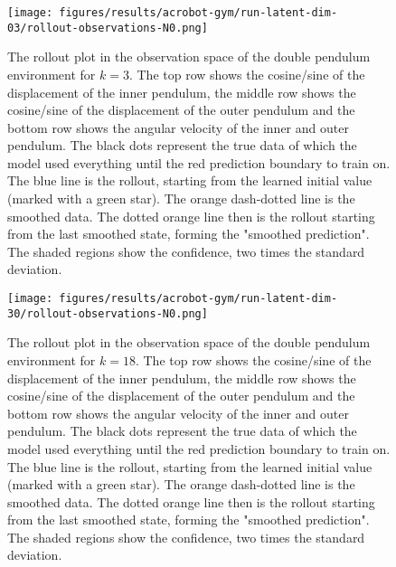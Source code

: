 		\begin{figure}
			\centering
			\texttt{[image: figures/results/acrobot-gym/run-latent-dim-03/rollout-observations-N0.png]}
			\caption[Rollout of the double pendulum experiment for 3 latent dimensions]{The rollout plot in the observation space of the double pendulum environment for \(k = 3\). The top row shows the cosine/sine of the displacement of the inner pendulum, the middle row shows the cosine/sine of the displacement of the outer pendulum and the bottom row shows the angular velocity of the inner and outer pendulum. The black dots represent the true data of which the model used everything until the red prediction boundary to train on. The blue line is the rollout, starting from the learned initial value (marked with a green star). The orange dash-dotted line is the smoothed data. The dotted orange line then is the rollout starting from the last smoothed state, forming the "smoothed prediction". The shaded regions show the confidence, \ie two times the standard deviation.}
			\label{fig:acrobotRolloutL03}
		\end{figure}

		\begin{figure}
			\centering
			\texttt{[image: figures/results/acrobot-gym/run-latent-dim-30/rollout-observations-N0.png]}
			\caption[Rollout of the double pendulum experiment for 30 latent dimensions]{The rollout plot in the observation space of the double pendulum environment for \(k = 18\). The top row shows the cosine/sine of the displacement of the inner pendulum, the middle row shows the cosine/sine of the displacement of the outer pendulum and the bottom row shows the angular velocity of the inner and outer pendulum. The black dots represent the true data of which the model used everything until the red prediction boundary to train on. The blue line is the rollout, starting from the learned initial value (marked with a green star). The orange dash-dotted line is the smoothed data. The dotted orange line then is the rollout starting from the last smoothed state, forming the "smoothed prediction". The shaded regions show the confidence, \ie two times the standard deviation.}
			\label{fig:acrobotRolloutL30}
		\end{figure}
